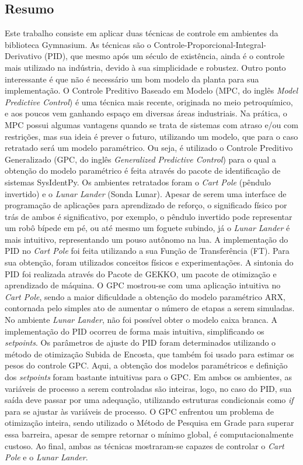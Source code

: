 \documentclass[12pt,           %
a4paper,                       %
openany,                       %
oneside,                       %
chapter=TITLE,                 %
english,                       %
spanish,                       %
brazil,                        %
sumario=tradicional]{abntex2}  %
\begin{document}
\begin{OnehalfSpace}                                %
\chapter*{Resumo}
\label{ch:resumo}


Este trabalho consiste em aplicar duas técnicas de controle em ambientes da biblioteca Gymnasium. As técnicas são o Controle-Proporcional-Integral-Derivativo (PID), que mesmo após um século de existência, ainda é o controle mais utilizado na indústria, devido à sua simplicidade e robustez. Outro ponto interessante é que não é necessário um bom modelo da planta para sua implementação. O Controle Preditivo Baseado em Modelo (MPC, do inglês \textit{Model Predictive Control}) é uma técnica mais recente, originada no meio petroquímico, e aos poucos vem ganhando espaço em diversas áreas industriais. Na prática, o MPC possui algumas vantagens quando se trata de sistemas com atraso e/ou com restrições, mas sua ideia é prever o futuro, utilizando um modelo, que para o caso retratado será um modelo paramétrico. Ou seja, é utilizado o Controle Preditivo Generalizado (GPC, do inglês \textit{Generalized Predictive Control}) para o qual a obtenção do modelo paramétrico é feita  através do pacote de identificação de sistemas SysIdentPy. Os ambientes retratados foram o \textit{Cart Pole} (pêndulo invertido) e o \textit{Lunar Lander} (Sonda Lunar). Apesar de serem uma interface de programação de aplicações para aprendizado de reforço, o significado físico por trás de ambos é significativo, por exemplo, o pêndulo invertido pode representar um robô bípede em pé, ou até mesmo um foguete subindo, já o \textit{Lunar Lander} é mais intuitivo, representando um pouso autônomo na lua. A implementação do PID no \textit{Cart Pole} foi feita utilizando a sua Função de Transferência (FT). Para sua obtenção, foram utilizados conceitos físicos e experimentações. A sintonia do PID foi realizada através do Pacote de GEKKO, um pacote de otimização e aprendizado de máquina. O GPC mostrou-se com uma aplicação intuitiva no \textit{Cart Pole}, sendo a maior dificuldade a obtenção do modelo paramétrico ARX, contornada pelo simples ato de aumentar o número de etapas a serem simuladas. No ambiente \textit{Lunar Lander}, não foi possível obter o modelo caixa branca. A implementação do PID ocorreu de forma mais intuitiva, simplificando os \textit{setpoints}. Os parâmetros de ajuste do PID foram determinados utilizando o método de otimização Subida de Encosta, que também foi usado para estimar os pesos do controle GPC. Aqui, a obtenção dos modelos  paramétricos e definição dos \textit{setpoints} foram bastante intuitivas para o GPC. Em ambos os ambientes, as variáveis de processo a serem controladas são inteiras, logo, no caso do PID, sua saída deve passar por uma adequação, utilizando estruturas condicionais como \textit{if} para se ajustar às variáveis de processo. O GPC enfrentou um problema de otimização inteira, sendo utilizado o Método de Pesquisa em Grade para superar essa barreira, apesar de sempre retornar o mínimo global, é computacionalmente custoso. Ao final, ambas as técnicas mostraram-se capazes de controlar o \textit{Cart Pole} e o \textit{Lunar Lander}.

\end{OnehalfSpace}
\end{document}
